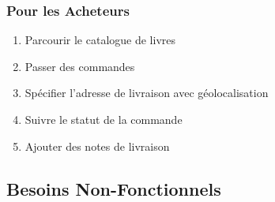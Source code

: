 \documentclass[12pt,a4paper]{report}
\begin{document}
\subsubsection{Pour les Acheteurs}

\begin{enumerate}
    \item Parcourir le catalogue de livres
    \item Passer des commandes
    \item Spécifier l'adresse de livraison avec géolocalisation
    \item Suivre le statut de la commande
    \item Ajouter des notes de livraison
\end{enumerate}

\subsection{Besoins Non-Fonctionnels}
\end{document}
